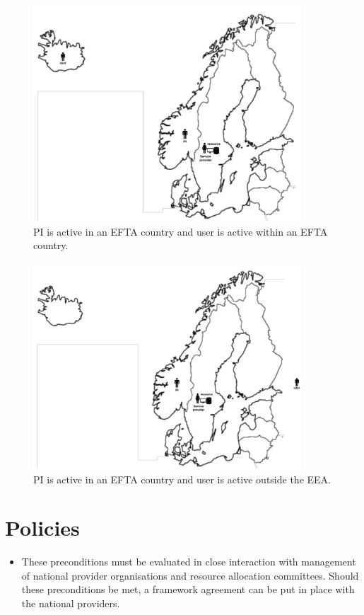 \documentclass{article}
\begin{document}
\begin{figure}[!ht]
\centering
\includegraphics[width=10cm]{PI_EAA_User_EEA.pdf}
\caption{PI is active in an EFTA country and user is active within an EFTA country.}\label{fig:eaa_eaa}
\end{figure}

\begin{figure}[!ht]
\centering
\includegraphics[width=10cm]{PI_EAA_User_Non_EU.pdf}
\caption{PI is active in an EFTA country and user is active outside the EEA.}\label{fig:eaa_non}
\end{figure}

\section{Policies}
\begin{itemize}
    \item []
These preconditions must be evaluated in close interaction with management of national provider organisations and resource allocation committees. Should these preconditions be met, a framework agreement can be put in place with the national providers.
\end{itemize}
\end{document}
